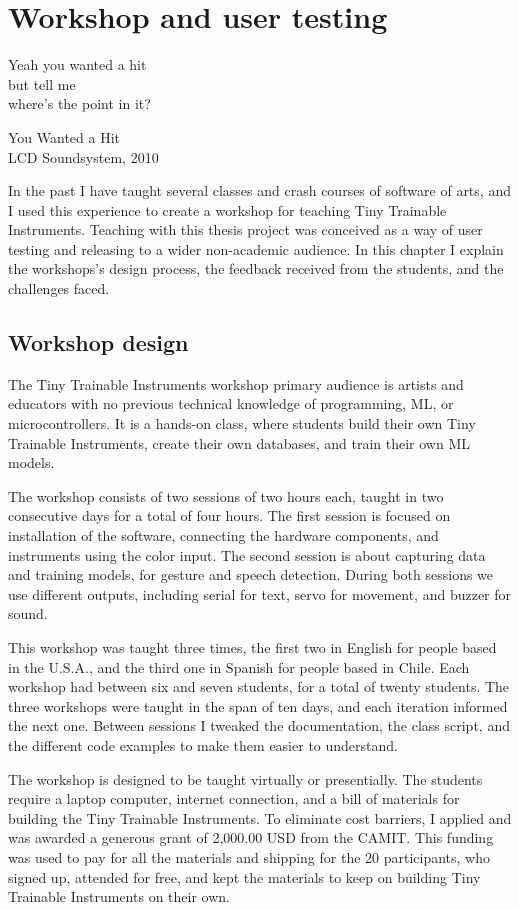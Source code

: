 \chapter{Workshop and user testing}

\epigraph{Yeah you wanted a hit \\ but tell me \\ where's the point in it?}{You Wanted a Hit \\ LCD Soundsystem, 2010}

In the past I have taught several classes and crash courses of software of arts, and I used this experience to create a workshop for teaching Tiny Trainable Instruments. Teaching with this thesis project was conceived as a way of user testing and releasing to a wider non-academic audience. In this chapter I explain the workshops's design process, the feedback received from the students, and the challenges faced.

\section{Workshop design}

The Tiny Trainable Instruments workshop primary audience is artists and educators with no previous technical knowledge of programming, \acrshort{ML}, or microcontrollers. It is a hands-on class, where students build their own Tiny Trainable Instruments, create their own databases, and train their own \acrshort{ML} models.

The workshop consists of two sessions of two hours each, taught in two consecutive days for a total of four hours. The first session is focused on installation of the software, connecting the hardware components, and instruments using the color input. The second session is about capturing data and training models, for gesture and speech detection. During both sessions we use different outputs, including serial for text, servo for movement, and buzzer for sound.

This workshop was taught three times, the first two in English for people based in the U.S.A., and the third one in Spanish for people based in Chile. Each workshop had between six and seven students, for a total of twenty students. The three workshops were taught in the span of ten days, and each iteration informed the next one. Between sessions I tweaked the documentation, the class script, and the different code examples to make them easier to understand.

The workshop is designed to be taught virtually or presentially. The students require a laptop computer, internet connection, and a bill of materials for building the Tiny Trainable Instruments. To eliminate cost barriers, I applied and was awarded a generous grant of 2,000.00 USD from the \acrlong{CAMIT}. This funding was used to pay for all the materials and shipping for the 20 participants, who signed up, attended for free, and kept the materials to keep on building Tiny Trainable Instruments on their own.

